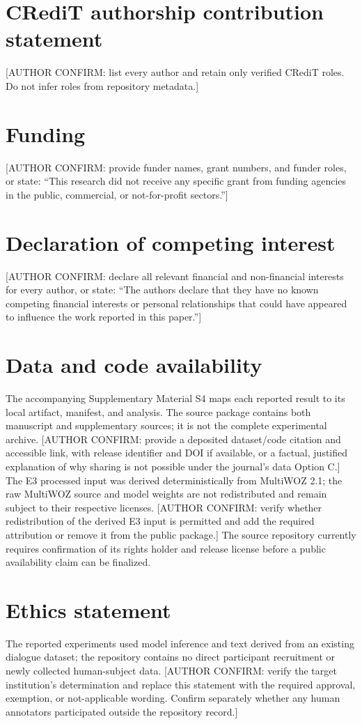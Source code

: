 \section*{CRediT authorship contribution statement}
[AUTHOR CONFIRM: list every author and retain only verified CRediT roles. Do not infer roles from repository metadata.]

\section*{Funding}
[AUTHOR CONFIRM: provide funder names, grant numbers, and funder roles, or state: ``This research did not receive any specific grant from funding agencies in the public, commercial, or not-for-profit sectors.'']

\section*{Declaration of competing interest}
[AUTHOR CONFIRM: declare all relevant financial and non-financial interests for every author, or state: ``The authors declare that they have no known competing financial interests or personal relationships that could have appeared to influence the work reported in this paper.'']

\section*{Data and code availability}
The accompanying Supplementary Material S4 maps each reported result to its local artifact, manifest, and analysis. The source package contains both manuscript and supplementary sources; it is not the complete experimental archive. [AUTHOR CONFIRM: provide a deposited dataset/code citation and accessible link, with release identifier and DOI if available, or a factual, justified explanation of why sharing is not possible under the journal's data Option C.] The E3 processed input was derived deterministically from MultiWOZ 2.1; the raw MultiWOZ source and model weights are not redistributed and remain subject to their respective licenses. [AUTHOR CONFIRM: verify whether redistribution of the derived E3 input is permitted and add the required attribution or remove it from the public package.] The source repository currently requires confirmation of its rights holder and release license before a public availability claim can be finalized.

\section*{Ethics statement}
The reported experiments used model inference and text derived from an existing dialogue dataset; the repository contains no direct participant recruitment or newly collected human-subject data. [AUTHOR CONFIRM: verify the target institution's determination and replace this statement with the required approval, exemption, or not-applicable wording. Confirm separately whether any human annotators participated outside the repository record.]


